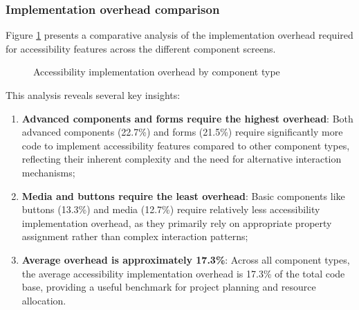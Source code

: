 \subsubsection{Implementation overhead comparison}

Figure \ref{fig:implementation_overhead_comparison} presents a comparative analysis of the implementation overhead required for accessibility features across the different component screens.

\begin{figure}[ht]
    \centering
    \caption{Accessibility implementation overhead by component type}
    \label{fig:implementation_overhead_comparison}
\end{figure}

This analysis reveals several key insights:

\begin{enumerate}
    \item \textbf{Advanced components and forms require the highest overhead}: Both advanced components (22.7\%) and forms (21.5\%) require significantly more code to implement accessibility features compared to other component types, reflecting their inherent complexity and the need for alternative interaction mechanisms;
    
    \item \textbf{Media and buttons require the least overhead}: Basic components like buttons (13.3\%) and media (12.7\%) require relatively less accessibility implementation overhead, as they primarily rely on appropriate property assignment rather than complex interaction patterns;
    
    \item \textbf{Average overhead is approximately 17.3\%}: Across all component types, the average accessibility implementation overhead is 17.3\% of the total code base, providing a useful benchmark for project planning and resource allocation.
\end{enumerate}

